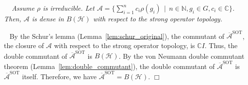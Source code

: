 \documentclass[twoside]{article}
\newenvironment{proof}[1][Proof\ ]{\medskip\noindent{\bf #1}\ }{%
\hfill $\Box$\par\quad\par}
\def\mcl#1{\mathcal{#1}}
\def\hil{\mcl{H}}
\def\opn{\operatorname}
\def\alg{\mcl{A}}
\newenvironment{mythm}[1][]{\medskip\par\noindent{\bfseries #1}\ \,\,\em}{\medskip\par}
\begin{document}
\begin{mythm}[Lemma~\ref{lem:schur}]
Assume $\rho$ is irreducible.
Let $\alg=\{\sum_{i=1}^nc_i\rho(g_i)\,\mid\,n\in\mathbb{N}, g_i\in G, c_i\in\mathbb{C}\}$. 
Then, $\alg$ is dense in $B(\hil)$ with respect to the strong operator topology.
\end{mythm}
\begin{proof}
By the Schur's lemma (Lemma~\ref{lem:schur_original}), the commutant of $\overline{\alg}^{\opn{SOT}}$, the closure of $\alg$ with respect to the strong operator topology, is $\mathbb{C}I$.
Thus, the double commutant of $\overline{\mcl{A}}^{\opn{SOT}}$ is $B(\hil)$.
By the von Neumann double commutant theorem (Lemma~\ref{lem:double_commutant}), the double commutant of $\overline{\mcl{A}}^{\opn{SOT}}$ is $\overline{\mcl{A}}^{\opn{SOT}}$ itself.
Therefore, we have $\overline{\mcl{A}}^{\opn{SOT}}=B(\hil)$.
\end{proof}
\end{document}
